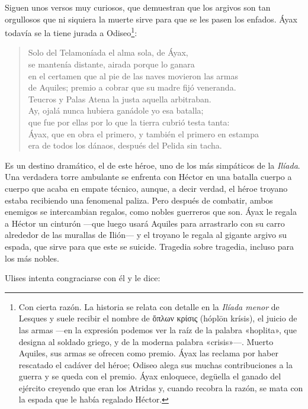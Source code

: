 \documentclass[11pt,a4paper]{article}
\newcommand{\gr}[1]{\foreignlanguage{greek}{#1}}
\begin{document}
Siguen unos versos muy curiosos, que demuestran que los argivos son tan orgullosos que ni siquiera la muerte sirve para que se les pasen los enfados. Áyax todavía se la tiene jurada a Odiseo\footnote{Con cierta razón. La historia se relata con detalle en la \emph{Ilíada menor} de Lesques y suele recibir el nombre de \gr{ὅπλων κρίσις} (hóplōn krísis), el juicio de las armas ---en la expresión podemos ver la raíz de la palabra «hoplita», que designa al soldado griego, y de la moderna palabra «crisis»---. Muerto Aquiles, sus armas se ofrecen como premio. Áyax las reclama por haber rescatado el cadáver del héroe; Odiseo alega sus muchas contribuciones a la guerra y se queda con el premio. Áyax enloquece, degüella el ganado del ejército creyendo que eran los Atridas y, cuando recobra la razón, se mata con la espada que le había regalado Héctor.}:


\begin{verse}
Solo del Telamoníada el alma sola, de Áyax,\\
se mantenía distante, airada porque lo ganara\\
en el certamen que al pie de las naves movieron las armas\\
de Aquiles; premio a cobrar que su madre fijó veneranda.\\
Teucros y Palas Atena la justa aquella arbitraban.\\
Ay, ojalá nunca hubiera ganádole yo esa batalla;\\
que fue por ellas por lo que la tierra cubrió testa tanta:\\
Áyax, que en obra el primero, y también el primero en estampa\\
era de todos los dánaos, después del Pelida sin tacha.
\end{verse}

Es un destino dramático, el de este héroe, uno de los más simpáticos de la \emph{Ilíada}. Una verdadera torre ambulante se enfrenta con Héctor en una batalla cuerpo a cuerpo que acaba en empate técnico, aunque, a decir verdad, el héroe troyano estaba recibiendo una fenomenal paliza. Pero después de combatir, ambos enemigos se intercambian regalos, como nobles guerreros que son. Áyax le regala a Héctor un cinturón ---que luego usará Aquiles para arrastrarlo con su carro alrededor de las murallas de Ilión--- y el troyano le regala al gigante argivo su espada, que sirve para que este se suicide. Tragedia sobre tragedia, incluso para los más nobles.

Ulises intenta congraciarse con él y le dice:
\end{document}
